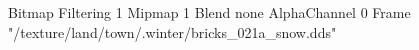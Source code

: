 {Bitmap
	{Filtering 1}
	{Mipmap 1}
	{Blend none}
	{AlphaChannel 0}
	{Frame "/texture/land/town/.winter/bricks_021a_snow.dds"}
}
